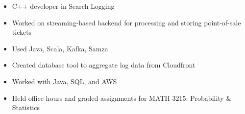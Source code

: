 \documentclass[10pt,letter,ragged2e,withhyper]{altacv}
\begin{document}
\begin{paracol}{2}




\begin{itemize}
  \item C++ developer in Search Logging
\end{itemize}

\divider

\begin{itemize}
\item Worked on streaming-based backend for processing and storing point-of-sale tickets
\item Used Java, Scala, Kafka, Samza
\end{itemize}

\divider

\begin{itemize}
\item Created database tool to aggregate log data from Cloudfront
\item Worked with Java, SQL, and AWS
\end{itemize}

\divider

\begin{itemize}
\item Held office hours and graded assignments for MATH 3215: Probability \& Statistics
\end{itemize}






\end{paracol}
\end{document}
